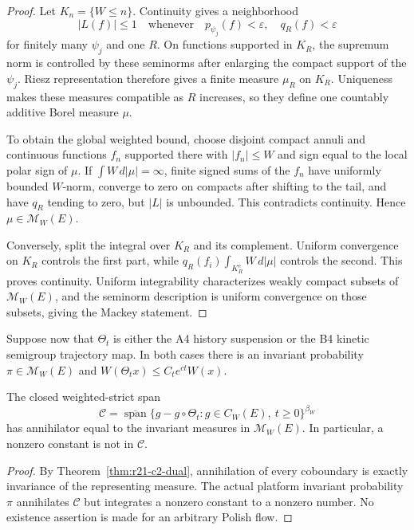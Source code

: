 \begin{proof}
Let $K_n=\{W\le n\}$.  Continuity gives a neighborhood
\[
 |L(f)|\le1
 \quad\text{whenever}\quad
 p_{\psi_j}(f)<\varepsilon,\quad q_R(f)<\varepsilon
\]
for finitely many $\psi_j$ and one $R$.  On functions supported in $K_R$, the
supremum norm is controlled by these seminorms after enlarging the compact
support of the $\psi_j$.  Riesz representation therefore gives a finite
measure $\mu_R$ on $K_R$.  Uniqueness makes these measures compatible as $R$
increases, so they define one countably additive Borel measure $\mu$.

To obtain the global weighted bound, choose disjoint compact annuli and
continuous functions $f_n$ supported there with
$|f_n|\le W$ and sign equal to the local polar sign of $\mu$.  If
$\int W\,d|\mu|=\infty$, finite signed sums of the $f_n$ have uniformly bounded
$W$-norm, converge to zero on compacts after shifting to the tail, and have
$q_R$ tending to zero, but $|L|$ is unbounded.  This contradicts continuity.
Hence $\mu\in\mathcal M_W(E)$.

Conversely, split the integral over $K_R$ and its complement.  Uniform
convergence on $K_R$ controls the first part, while
$q_R(f_i)\int_{K_R^c}W\,d|\mu|$ controls the second.  This proves continuity.
Uniform integrability characterizes weakly compact subsets of
$\mathcal M_W(E)$, and the seminorm description is uniform convergence on
those subsets, giving the Mackey statement.
\end{proof}

Suppose now that $\Theta_t$ is either the A4 history suspension or the B4
kinetic semigroup trajectory map.  In both cases there is an invariant
probability $\pi\in\mathcal M_W(E)$ and
$W(\Theta_tx)\le C_te^{ct}W(x)$.

\begin{corollary}
\label{cor:r21-c2-coboundary}
The closed weighted-strict span
\[
 \mathcal C=\overline{\operatorname{span}}
 \{g-g\circ\Theta_t:g\in C_W(E),\ t\ge0\}^{\beta_W}
\]
has annihilator equal to the invariant measures in $\mathcal M_W(E)$.  In
particular, a nonzero constant is not in $\mathcal C$.
\end{corollary}

\begin{proof}
By Theorem~\ref{thm:r21-c2-dual}, annihilation of every coboundary is exactly
invariance of the representing measure.  The actual platform invariant
probability $\pi$ annihilates $\mathcal C$ but integrates a nonzero constant to
a nonzero number.  No existence assertion is made for an arbitrary Polish
flow.
\end{proof}

